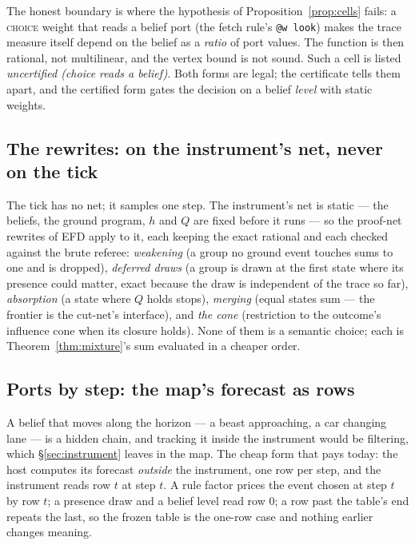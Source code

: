 \documentclass[11pt]{article}
\theoremstyle{plain}
\theoremstyle{definition}
\theoremstyle{remark}
\begin{document}
The honest boundary is where the hypothesis of
Proposition~\ref{prop:cells} fails: a \textsc{choice} weight that reads
a belief port (the fetch rule's \texttt{@w look}) makes the trace
measure itself depend on the belief as a \emph{ratio} of port values.
The function is then rational, not multilinear, and the vertex bound is
not sound. Such a cell is listed \emph{uncertified (choice reads a
belief)}. Both forms are legal; the certificate tells them apart, and
the certified form gates the decision on a belief \emph{level} with
static weights.

\subsection{The rewrites: on the instrument's net, never on the tick}

The tick has no net; it samples one step. The instrument's net is
static --- the beliefs, the ground program, $h$ and $Q$ are fixed before
it runs --- so the proof-net rewrites of EFD \cite{EFD26} apply to it,
each keeping the exact rational and each checked against the brute
referee: \emph{weakening} (a group no ground event touches sums to one
and is dropped), \emph{deferred draws} (a group is drawn at the first
state where its presence could matter, exact because the draw is
independent of the trace so far), \emph{absorption} (a state where $Q$
holds stops), \emph{merging} (equal states sum --- the frontier is the
cut-net's interface), and \emph{the cone} (restriction to the outcome's
influence cone when its closure holds). None of them is a semantic
choice; each is Theorem~\ref{thm:mixture}'s sum evaluated in a cheaper
order.

\subsection{Ports by step: the map's forecast as rows}\label{sec:bystep}

A belief that moves along the horizon --- a beast approaching, a car
changing lane --- is a hidden chain, and tracking it inside the
instrument would be filtering, which \S\ref{sec:instrument} leaves in
the map. The cheap form that pays today: the host computes its forecast
\emph{outside} the instrument, one row per step, and the instrument
reads row $t$ at step $t$. A rule factor prices the event chosen at step
$t$ by row $t$; a presence draw and a belief level read row $0$; a row
past the table's end repeats the last, so the frozen table is the
one-row case and nothing earlier changes meaning.
\end{document}
